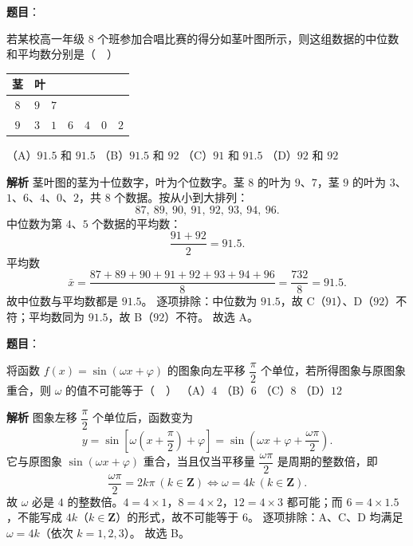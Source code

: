 \begin{answer}

\textbf{题目}：

若某校高一年级 $8$ 个班参加合唱比赛的得分如茎叶图所示，则这组数据的中位数和平均数分别是（　）

\begin{center}
\begin{tabular}{cl}
\toprule
茎 & 叶 \\
\midrule
$8$ & $9\quad7$ \\
$9$ & $3\quad1\quad6\quad4\quad0\quad2$ \\
\bottomrule
\end{tabular}
\end{center}

（A）$91.5$ 和 $91.5$
（B）$91.5$ 和 $92$
（C）$91$ 和 $91.5$
（D）$92$ 和 $92$

\textbf{解析}
茎叶图的茎为十位数字，叶为个位数字。茎 $8$ 的叶为 $9$、$7$，茎 $9$ 的叶为 $3$、$1$、$6$、$4$、$0$、$2$，共 $8$ 个数据。按从小到大排列：
\nopagebreak[4]
\[87,\ 89,\ 90,\ 91,\ 92,\ 93,\ 94,\ 96.\]
中位数为第 $4$、$5$ 个数据的平均数：
\nopagebreak[4]
\[\frac{91+92}{2}=91.5.\]
平均数
\nopagebreak[4]
\[\bar x=\frac{87+89+90+91+92+93+94+96}{8}=\frac{732}{8}=91.5.\]
故中位数与平均数都是 $91.5$。
逐项排除：中位数为 $91.5$，故 C（$91$）、D（$92$）不符；平均数同为 $91.5$，故 B（$92$）不符。
故选 A。


\end{answer}
\begin{answer}

\textbf{题目}：

将函数 $f(x)=\sin(\omega x+\varphi)$ 的图象向左平移 $\dfrac{\pi}{2}$ 个单位，若所得图象与原图象重合，则 $\omega$ 的值不可能等于（　）
（A）$4$
（B）$6$
（C）$8$
（D）$12$

\textbf{解析}
图象左移 $\dfrac\pi2$ 个单位后，函数变为
\nopagebreak[4]
\[y=\sin\left[\omega\left(x+\frac\pi2\right)+\varphi\right]=\sin\left(\omega x+\varphi+\frac{\omega\pi}{2}\right).\]
它与原图象 $\sin(\omega x+\varphi)$ 重合，当且仅当平移量 $\dfrac{\omega\pi}{2}$ 是周期的整数倍，即
\nopagebreak[4]
\[\frac{\omega\pi}{2}=2k\pi\ (k\in\mathbf Z)\iff\omega=4k\ (k\in\mathbf Z).\]
故 $\omega$ 必是 $4$ 的整数倍。$4=4\times1$，$8=4\times2$，$12=4\times3$ 都可能；而 $6=4\times1.5$，不能写成 $4k$（$k\in\mathbf Z$）的形式，故不可能等于 $6$。
逐项排除：A、C、D 均满足 $\omega=4k$（依次 $k=1,2,3$）。
故选 B。


\end{answer}
